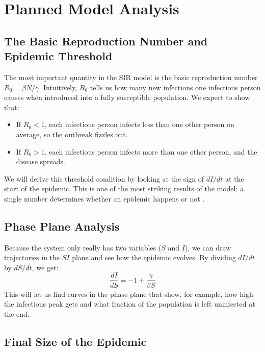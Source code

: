 \documentclass[11pt]{article}
\begin{document}
\section{Planned Model Analysis}

\subsection{The Basic Reproduction Number and Epidemic Threshold}

The most important quantity in the SIR model is the basic reproduction number $R_0 = \beta N / \gamma$. Intuitively, $R_0$ tells us how many new infections one infectious person causes when introduced into a fully susceptible population. We expect to show that:

\begin{itemize}
    \item If $R_0 < 1$, each infectious person infects less than one other person on average, so the outbreak fizzles out.
    \item If $R_0 > 1$, each infectious person infects more than one other person, and the disease spreads.
\end{itemize}

We will derive this threshold condition by looking at the sign of $dI/dt$ at the start of the epidemic. This is one of the most striking results of the model: a single number determines whether an epidemic happens or not \cite{hethcote2000}.

\subsection{Phase Plane Analysis}

Because the system only really has two variables ($S$ and $I$), we can draw trajectories in the $SI$ plane and see how the epidemic evolves. By dividing $dI/dt$ by $dS/dt$, we get:
\begin{equation}
    \frac{dI}{dS} = -1 + \frac{\gamma}{\beta S}
\end{equation}
This will let us find curves in the phase plane that show, for example, how high the infectious peak gets and what fraction of the population is left uninfected at the end.

\subsection{Final Size of the Epidemic}
\end{document}
